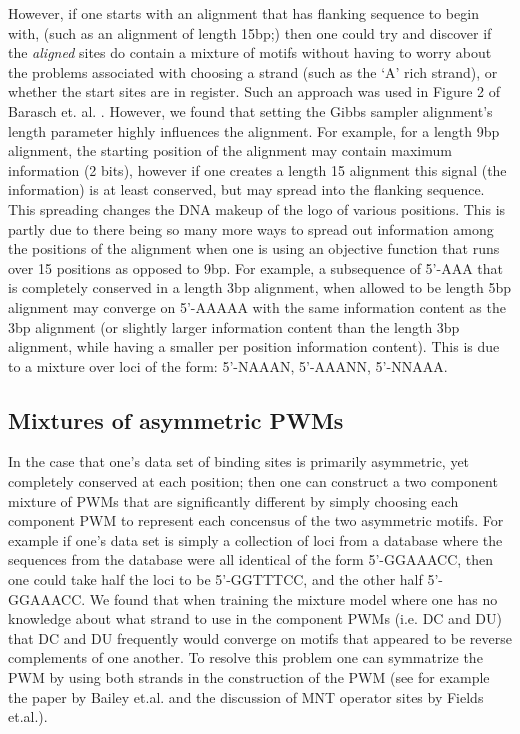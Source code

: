   However, if one starts with an alignment that has flanking sequence to begin with, (such as an alignment of length 15bp;) then one could try and discover if the \textit{aligned} sites do contain a mixture of motifs without having to worry about the problems associated with choosing a strand (such as the `A' rich strand), or whether the start sites are in register.  Such an approach was used in Figure 2 of Barasch et. al. \cite{barasch}.  However, we found that setting the Gibbs sampler alignment's length parameter highly influences the alignment.  For example, for a length 9bp alignment, the starting position of the alignment may contain maximum information (2 bits), however if one creates a length 15 alignment this signal (the information) is at least conserved, but may spread into the flanking sequence.  This spreading changes the DNA makeup of the logo of various positions.  This is partly due to there being so many more ways to spread out information among the positions of the alignment when one is using an objective function that runs over 15 positions as opposed to 9bp.  For example, a subsequence of 5'-AAA that is completely conserved in a length 3bp  alignment, when allowed to be length 5bp alignment may converge on 5'-AAAAA with the same information content as the 3bp alignment (or slightly larger information content than the length 3bp alignment, while having a smaller per position information content).  This is due to a mixture over loci of the form: 5'-NAAAN, 5'-AAANN, 5'-NNAAA.
  
  
\subsection{Mixtures of asymmetric PWMs}
In the case that one's data set of binding sites is primarily asymmetric, yet completely conserved at each position; then one can construct a two component mixture of PWMs that are significantly different by simply choosing each component PWM to represent each concensus of the two asymmetric motifs.  For example if one's data set is simply a collection of loci from a database where the sequences from the database were all identical of the form 5'-GGAAACC, then one could take half the loci to be 5'-GGTTTCC, and the other half 5'-GGAAACC.  We found that when training the mixture model where one has no knowledge about what strand to use in the component PWMs (i.e. DC and DU) that DC and DU frequently would converge on motifs that appeared to be reverse complements of one another.  To resolve this problem one can symmatrize the PWM by using both strands in the construction of the PWM (see for example the paper by Bailey et.al.\cite{pmid7584439} and the discussion of MNT operator sites by Fields et.al.\cite{pmid9268651}).

